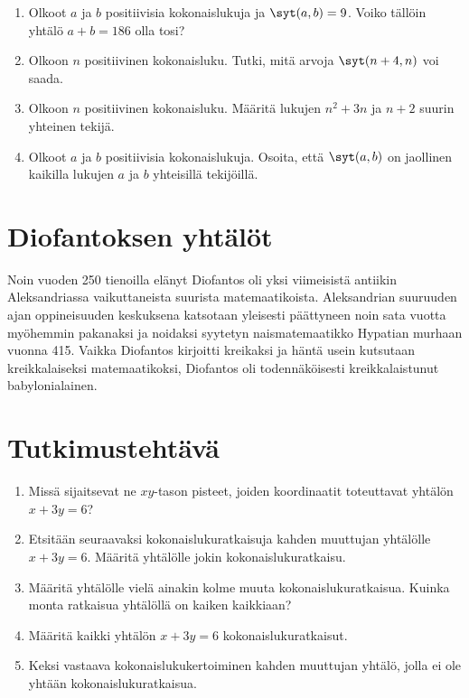 \begin{enumerate}
\item Olkoot $a$ ja $b$ positiivisia kokonaislukuja ja $\syt(a,b)=9$. Voiko tällöin yhtälö $a + b = 186$ olla tosi?

\item Olkoon $n$ positiivinen kokonaisluku. Tutki, mitä arvoja $\syt(n+4,n)$ voi saada.

\item Olkoon $n$ positiivinen kokonaisluku. Määritä lukujen $n^2 + 3n$ ja $n + 2$ suurin yhteinen tekijä.

\item Olkoot $a$ ja $b$ positiivisia kokonaislukuja. Osoita, että $\syt(a,b)$ on jaollinen kaikilla lukujen $a$ ja $b$ yhteisillä tekijöillä.

\end{enumerate}


\newpage

\section{Diofantoksen yhtälöt}
Noin vuoden 250 tienoilla elänyt Diofantos oli yksi viimeisistä antiikin Aleksandriassa vaikuttaneista suurista matemaatikoista. Aleksandrian suuruuden ajan oppineisuuden keskuksena katsotaan yleisesti päättyneen noin sata vuotta myöhemmin pakanaksi ja noidaksi syytetyn naismatemaatikko Hypatian murhaan vuonna 415. Vaikka Diofantos kirjoitti kreikaksi ja häntä usein kutsutaan kreikkalaiseksi matemaatikoksi, Diofantos oli todennäköisesti kreikkalaistunut babylonialainen. 

\section*{Tutkimustehtävä}
\begin{enumerate}
\item Missä sijaitsevat ne $xy$-tason pisteet, joiden koordinaatit toteuttavat yhtälön $x + 3y = 6$?
\item Etsitään seuraavaksi kokonaislukuratkaisuja kahden muuttujan yhtälölle $x + 3y = 6$. Määritä yhtälölle jokin kokonaislukuratkaisu.
\item Määritä yhtälölle vielä ainakin kolme muuta kokonaislukuratkaisua. Kuinka monta ratkaisua yhtälöllä on kaiken kaikkiaan?
\item Määritä kaikki yhtälön $x + 3y = 6$ kokonaislukuratkaisut.
\item Keksi vastaava kokonaislukukertoiminen kahden muuttujan yhtälö, jolla ei ole yhtään kokonaislukuratkaisua.
\end{enumerate}

